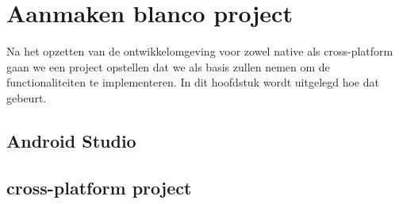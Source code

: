 
\chapter{Aanmaken blanco project}%
\label{ch:projecten}

Na het opzetten van de ontwikkelomgeving voor zowel native als cross-platform gaan 
we een project opstellen dat we als basis zullen nemen om de functionaliteiten te 
implementeren. In dit hoofdstuk wordt uitgelegd hoe dat gebeurt.

\section{Android Studio}



\section{cross-platform project}\label{sec:projectencross}

